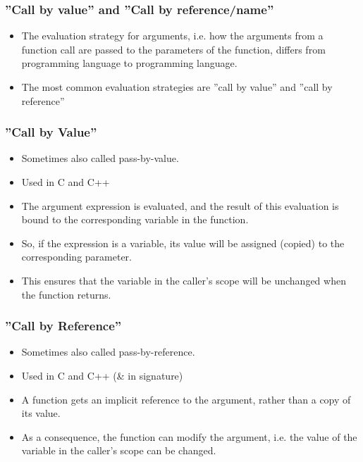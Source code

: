 \begin{frame}[fragile]\frametitle{''Call by value'' and ''Call by reference/name''}
    \begin{itemize}
    \item The evaluation strategy for arguments, i.e. how the arguments from a function call are passed to the parameters of the function, differs from programming language to programming language.
    \item The most common evaluation strategies are ''call by value'' and ''call by reference''
            \end{itemize}
\end{frame}

\begin{frame}[fragile]\frametitle{''Call by Value'' }
    \begin{itemize}
    \item Sometimes also called pass-by-value.
    \item Used in C and C++
    \item The argument expression is evaluated, and the result of this evaluation is bound to the corresponding variable in the function. 
    \item So, if the expression is a variable, its value will be assigned (copied) to the corresponding parameter. 
    \item This ensures that the variable in the caller's scope will be unchanged when the function returns. 
            \end{itemize}
\end{frame}

\begin{frame}[fragile]\frametitle{''Call by Reference'' }
    \begin{itemize}
    \item Sometimes also called pass-by-reference.
    \item  Used in C and C++ (\& in signature)
    \item A function gets an implicit reference to the argument, rather than a copy of its value. 
    \item As a consequence, the function can modify the argument, i.e. the value of the variable in the caller's scope can be changed.
            \end{itemize}
\end{frame}


